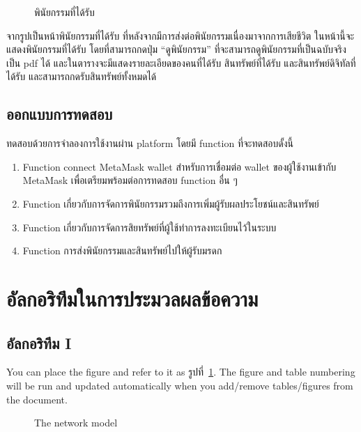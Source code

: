 \documentclass[12pt,oneside,openright,a4paper]{cpe-thai-project}
\begin{document}
\begin{enumerate}[label=\thesubsection.\arabic*,leftmargin=0pt,itemindent=2.5cm]
\begin{figure}[!thb]
			\caption{พินัยกรรมที่ได้รับ}
		\end{figure}
		\FloatBarrier
		\tab จากรูปเป็นหน้าพินัยกรรมที่ได้รับ ที่หลังจากมีการส่งต่อพินัยกรรมเนื่องมาจากการเสียชีวิต ในหน้านี้จะแสดงพินัยกรรมที่ได้รับ โดยที่สามารถกดปุ่ม “ดูพินัยกรรม” ที่จะสามารถดูพินัยกรรมที่เป็นฉบับจริงเป็น pdf ได้ และในตารางจะมีแสดงรายละเอียดของคนที่ได้รับ สินทรัพย์ที่ได้รับ และสินทรัพย์ดิจิทัลที่ได้รับ และสามารถกดรับสินทรัพย์ทั้งหมดได้ 
	\end{enumerate}
\subsection{ออกแบบการทดสอบ}
\tab ทดสอบด้วยการจำลองการใช้งานผ่าน platform โดยมี function ที่จะทดสอบดั้งนี้
	\begin{enumerate}[label=\thesubsection.\arabic*,leftmargin=0pt,itemindent=2.5cm]
		\item Function connect MetaMask wallet สําหรับการเชื่อมต่อ wallet ของผู้ใช้งานเข้ากับ MetaMask เพื่อเตรียมพร้อมต่อการทดสอบ function อื่น ๆ
		\item Function เกี่ยวกับการจัดการพินัยกรรมรวมถึงการเพิ่มผู้รับผลประโยชน์และสินทรัพย์ 
		\item Function เกี่ยวกับการจัดการสิยทรัพย์ที่ผู้ใช้ทำการลงทะเบียนไว้ในระบบ
		\item Function การส่งพินัยกรรมและสินทรัพย์ไปให้ผู้รับมรดก
	\end{enumerate}
\section{อัลกอริทึมในการประมวลผลข้อความ}
\subsection{อัลกอริทึม I}

You can place the figure and refer to it as รูปที่~\ref{fig:model2}.
The figure and table numbering will be run and updated automatically when you add/remove tables/figures from the document.

\begin{figure}[!h]\centering
\setlength{\fboxrule}{0.2mm} %
\setlength{\fboxsep}{1cm}
\caption{The network model}\label{fig:model2}
\end{figure}
\end{document}
